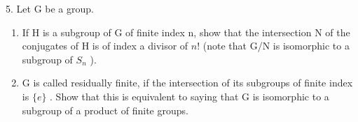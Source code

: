 5. Let G be a group.

\begin{enumerate}
\def\labelenumi{(\alph{enumi})}
\item
  If H is a subgroup of G of finite index n, show that the intersection N of the conjugates of H is of index a divisor of \(n!\) (note that G/N is isomorphic to a subgroup of \(S_{n}\) ).
\item
  G is called residually finite, if the intersection of its subgroups of finite index is \(\{e\}\) . Show that this is equivalent to saying that G is isomorphic to a subgroup of a product of finite groups.
\end{enumerate}

